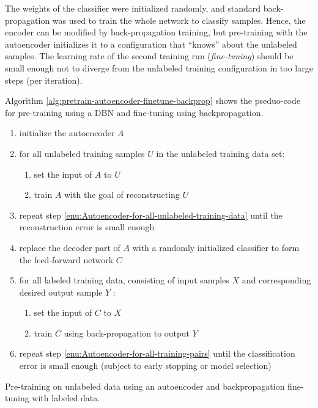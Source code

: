 The weights of the classifier were initialized randomly, and standard
back-propagation was used to train the whole network to classify samples.
Hence, the encoder can be modified by back-propagation training, but
pre-training with the autoencoder initializes it to a configuration
that ``knows'' about the unlabeled samples. The learning rate of
the second training run (\emph{fine-tuning}) should
be small enough not to diverge from the unlabeled training configuration
in too large steps (per iteration).

Algorithm \ref{alg:pretrain-autoencoder-finetune-backprop} shows
the pseduo-code for pre-training using a DBN and fine-tuning using
backpropagation.

\begin{algorithm}
\begin{enumerate}
\item initialize the autoencoder $A$
\item \label{enu:Autoencoder-for-all-unlabeled-training-data}for all unlabeled
training samples $U$ in the unlabeled training data set:

\begin{enumerate}
\item set the input of $A$ to $U$
\item train $A$ with the goal of reconstructing $U$
\end{enumerate}
\item repeat step \ref{enu:Autoencoder-for-all-unlabeled-training-data}
until the reconstruction error is small enough
\item replace the decoder part of $A$ with a randomly initialized classifier
to form the feed-forward network $C$
\item \label{enu:Autoencoder-for-all-training-pairs}for all labeled training
data, consisting of input samples $X$ and corresponding desired output
sample $Y$ :

\begin{enumerate}
\item set the input of $C$ to $X$
\item train $C$ using back-propagation to output $Y$
\end{enumerate}
\item repeat step \ref{enu:Autoencoder-for-all-training-pairs} until the
classification error is small enough (subject to early stopping or
model selection)
\end{enumerate}
\caption{\label{alg:pretrain-autoencoder-finetune-backprop}Pre-training on
unlabeled data using an autoencoder and backpropagation fine-tuning
with labeled data.}
\end{algorithm}

